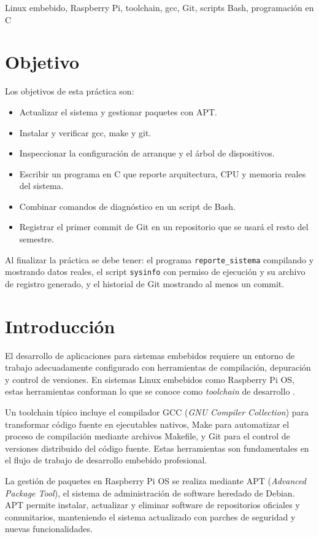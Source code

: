 \documentclass[conference]{IEEEtran}
\begin{document}
\begin{IEEEkeywords}
	Linux embebido, Raspberry Pi, toolchain, gcc, Git, scripts Bash, programación en C
\end{IEEEkeywords}

\section{Objetivo}
Los objetivos de esta práctica son:
\begin{itemize}
	\item Actualizar el sistema y gestionar paquetes con APT.
	\item Instalar y verificar gcc, make y git.
	\item Inspeccionar la configuración de arranque y el árbol de dispositivos.
	\item Escribir un programa en C que reporte arquitectura, CPU y memoria reales del sistema.
	\item Combinar comandos de diagnóstico en un script de Bash.
	\item Registrar el primer commit de Git en un repositorio que se usará el resto del semestre.
\end{itemize}

Al finalizar la práctica se debe tener: el programa \texttt{reporte\_sistema} compilando y mostrando datos reales, el script \texttt{sysinfo} con permiso de ejecución y su archivo de registro generado, y el historial de Git mostrando al menos un commit.

\section{Introducción}
El desarrollo de aplicaciones para sistemas embebidos requiere un entorno de trabajo adecuadamente configurado con herramientas de compilación, depuración y control de versiones. En sistemas Linux embebidos como Raspberry Pi OS, estas herramientas conforman lo que se conoce como \textit{toolchain} de desarrollo \cite{gnu_toolchain}.

Un toolchain típico incluye el compilador GCC (\textit{GNU Compiler Collection}) para transformar código fuente en ejecutables nativos, Make para automatizar el proceso de compilación mediante archivos Makefile, y Git para el control de versiones distribuido del código fuente. Estas herramientas son fundamentales en el flujo de trabajo de desarrollo embebido profesional.

La gestión de paquetes en Raspberry Pi OS se realiza mediante APT (\textit{Advanced Package Tool}), el sistema de administración de software heredado de Debian. APT permite instalar, actualizar y eliminar software de repositorios oficiales y comunitarios, manteniendo el sistema actualizado con parches de seguridad y nuevas funcionalidades.
\end{document}
